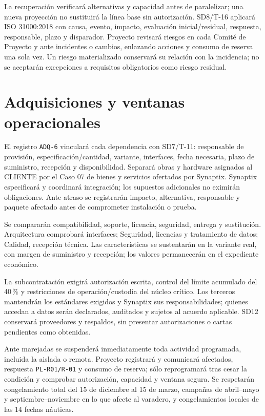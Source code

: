 La recuperación verificará alternativas y capacidad antes de paralelizar; una nueva proyección no sustituirá la línea base sin autorización. SD8/T-16 aplicará ISO 31000:2018 con causa, evento, impacto, evaluación inicial/residual, respuesta, responsable, plazo y disparador. Proyecto revisará riesgos en cada Comité de Proyecto y ante incidentes o cambios, enlazando acciones y consumo de reserva una sola vez. Un riesgo materializado conservará su relación con la incidencia; no se aceptarán excepciones a requisitos obligatorios como riesgo residual. \parencites[RT-19.04, p.~33]{sd6-bt}{sd6-iso31000}


\section{Adquisiciones y ventanas operacionales}

El registro \texttt{ADQ-6} vinculará cada dependencia con SD7/T-11: responsable de provisión, especificación/cantidad, variante, interfaces, fecha necesaria, plazo de suministro, recepción y disponibilidad. Separará obras y hardware asignados al CLIENTE por el Caso 07 de bienes y servicios ofertados por Synaptix. Synaptix especificará y coordinará integración; los supuestos adicionales no eximirán obligaciones. Ante atraso se registrarán impacto, alternativa, responsable y paquete afectado antes de comprometer instalación o prueba. \parencite[cap.~11, pp.~26--27]{sd6-c07}

Se compararán compatibilidad, soporte, licencia, seguridad, entrega y sustitución. Arquitectura comprobará interfaces; Seguridad, licencias y tratamiento de datos; Calidad, recepción técnica. Las características se sustentarán en la variante real, con margen de suministro y recepción; los valores permanecerán en el expediente económico.

La subcontratación exigirá autorización escrita, control del límite acumulado del 40\,\% y restricciones de operación/custodia del núcleo crítico. Los terceros mantendrán los estándares exigidos y Synaptix sus responsabilidades; quienes accedan a datos serán declarados, auditados y sujetos al acuerdo aplicable. SD12 conservará proveedores y respaldos, sin presentar autorizaciones o cartas pendientes como obtenidas. \parencite[art.~73, p.~38]{sd6-ba}

Ante marejadas se suspenderá inmediatamente toda actividad programada, incluida la aislada o remota. Proyecto registrará y comunicará afectados, respuesta \texttt{PL-R01/R-01} y consumo de reserva; sólo reprogramará tras cesar la condición y comprobar autorización, capacidad y ventana segura. Se respetarán congelamiento total del 15 de diciembre al 15 de marzo, campañas de abril--mayo y septiembre--noviembre en lo que afecte al varadero, y congelamientos locales de las 14 fechas náuticas.

